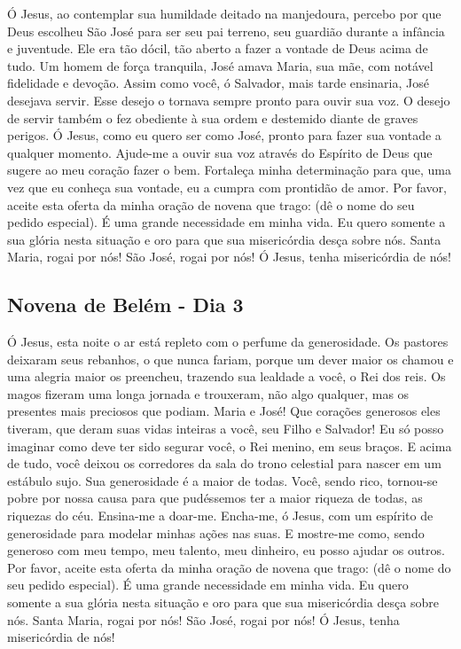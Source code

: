 \documentclass[a4paper,14pt,twoside]{extarticle} \usepackage[utf8]{inputenc}
\begin{document}
Ó Jesus, ao contemplar sua humildade deitado na manjedoura, percebo por que Deus escolheu São José para ser seu pai terreno, seu guardião durante a infância e juventude. Ele era tão dócil, tão aberto a fazer a vontade de Deus acima de tudo. Um homem de força tranquila, José amava Maria, sua mãe, com notável fidelidade e devoção. Assim como você, ó Salvador, mais tarde ensinaria, José desejava servir. Esse desejo o tornava sempre pronto para ouvir sua voz. O desejo de servir também o fez obediente à sua ordem e destemido diante de graves perigos.
Ó Jesus, como eu quero ser como José, pronto para fazer sua vontade a qualquer momento. Ajude-me a ouvir sua voz através do Espírito de Deus que sugere ao meu coração fazer o bem. Fortaleça minha determinação para que, uma vez que eu conheça sua vontade, eu a cumpra com prontidão de amor. Por favor, aceite esta oferta da minha oração de novena que trago: (dê o nome do seu pedido especial). É uma grande necessidade em minha vida. Eu quero somente a sua glória nesta situação e oro para que sua misericórdia desça sobre nós. Santa Maria, rogai por nós! São José, rogai por nós! Ó Jesus, tenha misericórdia de nós!


\subsection{Novena de Belém - Dia 3}

Ó Jesus, esta noite o ar está repleto com o perfume da generosidade. Os pastores deixaram seus rebanhos, o que nunca fariam, porque um dever maior os chamou e uma alegria maior os preencheu, trazendo sua lealdade a você, o Rei dos reis. Os magos fizeram uma longa jornada e trouxeram, não algo qualquer, mas os presentes mais preciosos que podiam. Maria e José! Que corações generosos eles tiveram, que deram suas vidas inteiras a você, seu Filho e Salvador! Eu só posso imaginar como deve ter sido segurar você, o Rei menino, em seus braços. E acima de tudo, você deixou os corredores da sala do trono celestial para nascer em um estábulo sujo. Sua generosidade é a maior de todas. Você, sendo rico, tornou-se pobre por nossa causa para que pudéssemos ter a maior riqueza de todas, as riquezas do céu. Ensina-me a doar-me. Encha-me, ó Jesus, com um espírito de generosidade para modelar minhas ações nas suas. E mostre-me como, sendo generoso com meu tempo, meu talento, meu dinheiro, eu posso ajudar os outros. Por favor, aceite esta oferta da minha oração de novena que trago: (dê o nome do seu pedido especial). É uma grande necessidade em minha vida. Eu quero somente a sua glória nesta situação e oro para que sua misericórdia desça sobre nós. Santa Maria, rogai por nós! São José, rogai por nós! Ó Jesus, tenha misericórdia de nós!
\end{document}
